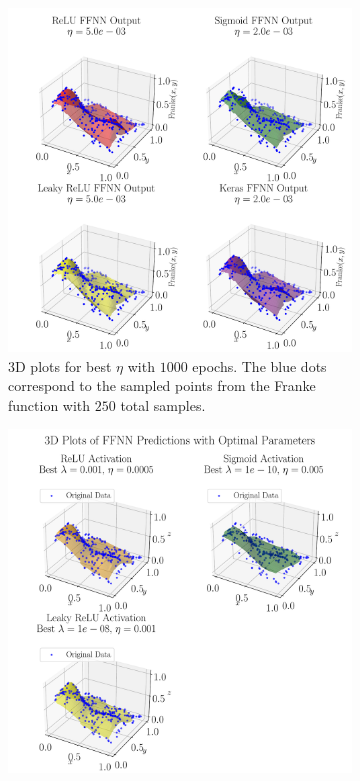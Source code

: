 \documentclass[%
reprint,s
amsmath,amssymb,
aps,
]{revtex4-2}
\begin{document}
\begin{figure}[ht!]
	\begin{subfigure}[b]{0.43\textwidth}
		\includegraphics[width=\textwidth]{Figures/NN_3D_Predict_Franke_Epochs1000.pdf}
		\caption{3D plots for best $\eta$ with $1000$ epochs. The blue dots correspond to the sampled points from the Franke function with $250$ total samples.}
		\label{fig:3D_Franke}
	\end{subfigure}
	\hfill
	\begin{subfigure}[b]{0.43\textwidth}
		\includegraphics[width=\textwidth]{Figures/NN_noKeras_3D_Franke_Epochs250.pdf}

\end{subfigure}
\end{figure}
\end{document}
